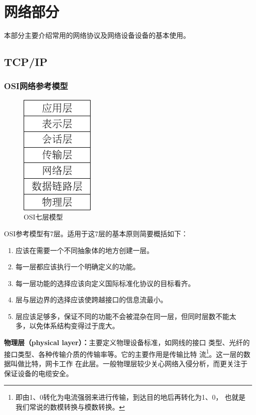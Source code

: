 \part{网络部分}
\label{part:network}

本部分主要介绍常用的网络协议及网络设备设备的基本使用。

\chapter{TCP/IP}
\label{chap:tcpIpProtocol}

\section{OSI网络参考模型}
\label{sec:osiModel}

\begin{figure}[!htbp]
  \centering
  \includegraphics{graph/osi-1.pdf}
    \caption{OSI七层模型}
  \label{fig:osi}
\end{figure}

OSI参考模型有7层。适用于这7层的基本原则简要概括如下：\cite{computernetworks}
\begin{enumerate}[parsep=0pt]
\item 应该在需要一个不同抽象体的地方创建一层。
\item 每一层都应该执行一个明确定义的功能。
\item 每一层功能的选择应该向定义国际标准化协议的目标看齐。
\item 层与层边界的选择应该使跨越接口的信息流最小。
\item 层应该足够多，保证不同的功能不会被混杂在同一层，但同时层数不能太
  多，以免体系结构变得过于庞大。
\end{enumerate}

{\bfseries{物理层（physical layer）：}}主要定义物理设备标准，如网线的接口
类型、光纤的接口类型、各种传输介质的传输率等。它的主要作用是传输比特
流\footnote{即由1、0转化为电流强弱来进行传输，到达目的地后再转化为1、0，
  也就是我们常说的数模转换与模数转换。}。这一层的数据叫做比特，网卡工作
在此层。一般物理层较少关心网络入侵分析，而更关注于保证设备的电缆安全。

